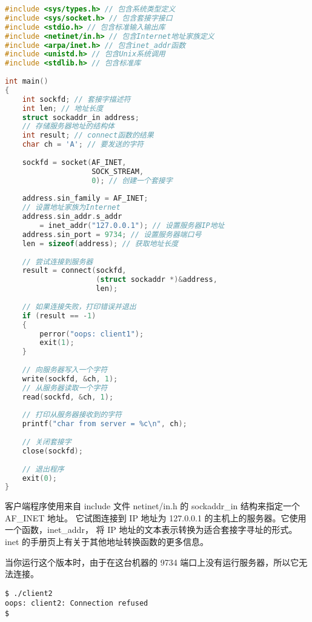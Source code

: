 \documentclass{ctexart}
\begin{document}
\begin{lstlisting}[language=C]    
#include <sys/types.h> // 包含系统类型定义  
#include <sys/socket.h> // 包含套接字接口  
#include <stdio.h> // 包含标准输入输出库  
#include <netinet/in.h> // 包含Internet地址家族定义  
#include <arpa/inet.h> // 包含inet_addr函数  
#include <unistd.h> // 包含Unix系统调用  
#include <stdlib.h> // 包含标准库  
  
int main()  
{  
    int sockfd; // 套接字描述符  
    int len; // 地址长度  
    struct sockaddr_in address; 
    // 存储服务器地址的结构体  
    int result; // connect函数的结果  
    char ch = 'A'; // 要发送的字符  
  
    sockfd = socket(AF_INET, 
                    SOCK_STREAM, 
                    0); // 创建一个套接字  
  
    address.sin_family = AF_INET; 
    // 设置地址家族为Internet  
    address.sin_addr.s_addr 
        = inet_addr("127.0.0.1"); // 设置服务器IP地址  
    address.sin_port = 9734; // 设置服务器端口号  
    len = sizeof(address); // 获取地址长度  
  
    // 尝试连接到服务器  
    result = connect(sockfd, 
                     (struct sockaddr *)&address, 
                     len);  
  
    // 如果连接失败，打印错误并退出  
    if (result == -1)  
    {  
        perror("oops: client1");  
        exit(1);  
    }  
  
    // 向服务器写入一个字符  
    write(sockfd, &ch, 1);  
    // 从服务器读取一个字符  
    read(sockfd, &ch, 1);  
  
    // 打印从服务器接收到的字符  
    printf("char from server = %c\n", ch);  
  
    // 关闭套接字  
    close(sockfd);  
  
    // 退出程序  
    exit(0);  
}  
\end{lstlisting}

客户端程序使用来自 include 文件 netinet/in.h 的 sockaddr\_in 结构来指定一个 AF\_INET 地址。
它试图连接到 IP 地址为 127.0.0.1 的主机上的服务器。它使用一个函数，inet\_addr，
将 IP 地址的文本表示转换为适合套接字寻址的形式。inet 的手册页上有关于其他地址转换函数的更多信息。  

当你运行这个版本时，由于在这台机器的 9734 端口上没有运行服务器，所以它无法连接。  
\begin{verbatim}  
$ ./client2  
oops: client2: Connection refused  
$  
\end{verbatim}  
\end{document}
